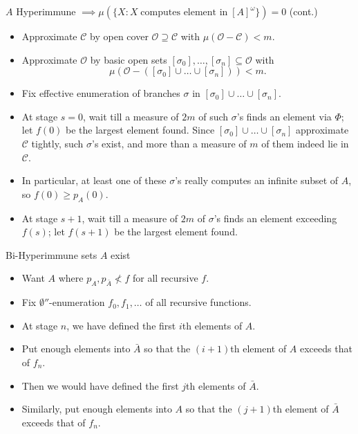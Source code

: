 \begin{frame}{$A$ Hyperimmune $\implies \mu(\{X: X\; \text{computes
element in}\; [A]^\omega\}) =0$ (cont.)}
  \begin{itemize}
    \item Approximate $\mathcal{C}$ by open cover
      $\mathcal{O}\supseteq\mathcal{C}$ with
      $\mu(\mathcal{O}-\mathcal{C})<m$.
    \item Approximate $\mathcal{O}$ by basic open sets
      $[\sigma_0],\ldots,[\sigma_n] \subseteq\mathcal{O}$ with
      \[\mu(\mathcal{O}-([\sigma_0]\cup\ldots\cup[\sigma_n])) <m.\]
    \item Fix effective enumeration of branches $\sigma$ in
      $[\sigma_0]\cup\ldots\cup[\sigma_n]$.
    \item At stage $s=0$, wait till a measure of $2m$ of such $\sigma$'s
      finds an element via $\Phi$; let $f(0)$ be the largest element found.
      Since $[\sigma_0]\cup\ldots\cup[\sigma_n]$ approximate $\mathcal{C}$
      tightly, such $\sigma$'s exist, and more than a measure of $m$ of
      them indeed lie in $\mathcal{C}$.
    \item In particular, at least one of these $\sigma$'s really computes
      an infinite subset of $A$, so $f(0)\geq p_A(0)$.
    \item At stage $s+1$, wait till a measure of $2m$ of $\sigma$'s
      finds an element exceeding $f(s)$; let $f(s+1)$ be the largest
      element found.
  \end{itemize}
\end{frame}

\begin{frame}{Bi-Hyperimmune sets $A$ exist}
  \begin{itemize}
    \item Want $A$ where $p_A,p_{\bar{A}}\not<f$ for all recursive $f$.
    \item Fix $\emptyset''$-enumeration $f_0,f_1,\ldots$ of all recursive
      functions.
    \item At stage $n$, we have defined the first $i$th elements of $A$.
    \item Put enough elements into $\bar{A}$ so that the $(i+1)$th element
      of $A$ exceeds that of $f_n$.
    \item Then we would have defined the first $j$th elements of $\bar{A}$.
    \item Similarly, put enough elements into $A$ so that the $(j+1)$th
      element of $\bar{A}$ exceeds that of $f_n$.
  \end{itemize}
\end{frame}
